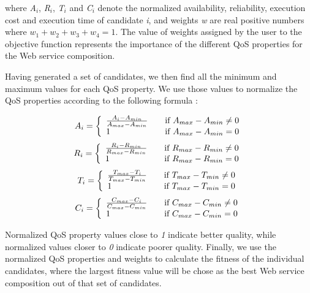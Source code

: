 where \emph{A$_{i}$}, \emph{R$_{i}$}, \emph{T$_{i}$} and  \emph{C$_{i}$} denote the normalized availability, reliability,  execution cost and  execution time of candidate \emph{i}, and weights \emph{w} are real positive numbers where $w_{1} + w_{2} + w_{3} + w_{4} = 1$. The value of weights assigned by the user to the objective function represents the importance of the different QoS properties for the Web service composition. \par

Having generated a set of candidates, we then find all the minimum and maximum values for each QoS property. We use those values to normalize the QoS properties according to the following formula \cite{4}:


\[A_i = \left\{
\begin{array}{l l} 
    \frac{A_i - A_{min}}{A_{max} - A_{min}}      & \quad \text{if  } A_{max} - A_{min} \neq 0\\
    1  & \quad \text{if  } A_{max} - A_{min} = 0\\
\end{array} \right. \]\label{eq:2}
\[R_i = \left\{
\begin{array}{l l} 
    \frac{R_i - R_{min}}{R_{max} - R_{min}}      & \quad \text{if  } R_{max} - R_{min} \neq 0\\
    1  & \quad \text{if  } R_{max} - R_{min} = 0\\
\end{array} \right. \]\label{eq:2}
\[T_i = \left\{
\begin{array}{l l} 
    \frac{T_{max} - T_i}{T_{max} - T_{min}}      & \quad \text{if  } T_{max} - T_{min} \neq 0\\
    1  & \quad \text{if  } T_{max} - T_{min} = 0\\
\end{array} \right. \]\label{eq:2}
\[C_i = \left\{
\begin{array}{l l} 
    \frac{C_{max} - C_i}{C_{max} - C_{min}}      & \quad \text{if  } C_{max} - C_{min} \neq 0\\
    1  & \quad \text{if  } C_{max} - C_{min} = 0\\
\end{array} \right. \]\label{eq:2}

Normalized QoS property values close to \emph{1} indicate better quality, while normalized values closer to \emph{0} indicate poorer quality. Finally, we use the normalized QoS properties and weights to calculate the fitness of the individual candidates, where the largest fitness value will be chose as the best Web service composition out of that set of candidates. 

